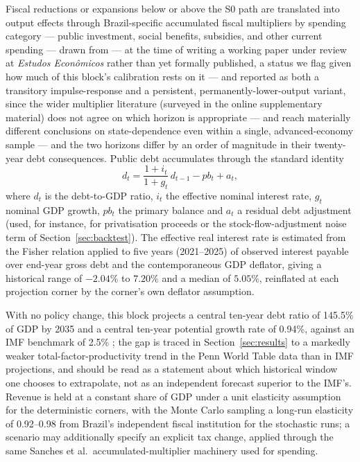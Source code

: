 \documentclass[11pt,a4paper]{article}
\begin{document}
Fiscal reductions or expansions below or above the \textsc{S0} path are translated into output effects through Brazil-specific accumulated fiscal multipliers by spending category --- public investment, social benefits, subsidies, and other current spending --- drawn from \citet{sanches2026} --- at the time of writing a working paper under review at \textit{Estudos Econ\^omicos} rather than yet formally published, a status we flag given how much of this block's calibration rests on it --- and reported as both a transitory impulse-response and a persistent, permanently-lower-output variant, since the wider multiplier literature (surveyed in the online supplementary material) does not agree on which horizon is appropriate --- \citet{auerbachgorodnichenko2012} and \citet{rameyzubairy2018} reach materially different conclusions on state-dependence even within a single, advanced-economy sample --- and the two horizons differ by an order of magnitude in their twenty-year debt consequences. Public debt accumulates through the standard identity
\begin{equation}
d_t = \frac{1+i_t}{1+g_t}\,d_{t-1} - pb_t + a_t,
\end{equation}
where $d_t$ is the debt-to-GDP ratio, $i_t$ the effective nominal interest rate, $g_t$ nominal GDP growth, $pb_t$ the primary balance and $a_t$ a residual debt adjustment (used, for instance, for privatisation proceeds or the stock-flow-adjustment noise term of Section~\ref{sec:backtest}). The effective real interest rate is estimated from the Fisher relation applied to five years (2021--2025) of observed interest payable over end-year gross debt and the contemporaneous GDP deflator, giving a historical range of $-2.04\%$ to $7.20\%$ and a median of $5.05\%$, reinflated at each projection corner by the corner's own deflator assumption.

With no policy change, this block projects a central ten-year debt ratio of 145.5\% of GDP by 2035 and a central ten-year potential growth rate of 0.94\%, against an IMF benchmark of 2.5\% \citep{imfweo2026}; the gap is traced in Section~\ref{sec:results} to a markedly weaker total-factor-productivity trend in the Penn World Table data than in IMF projections, and should be read as a statement about which historical window one chooses to extrapolate, not as an independent forecast superior to the IMF's. Revenue is held at a constant share of GDP under a unit elasticity assumption for the deterministic corners, with the Monte Carlo sampling a long-run elasticity of 0.92--0.98 from Brazil's independent fiscal institution \citep{ifi2021ee16} for the stochastic runs; a scenario may additionally specify an explicit tax change, applied through the same Sanches et al.\ accumulated-multiplier machinery used for spending.
\end{document}
